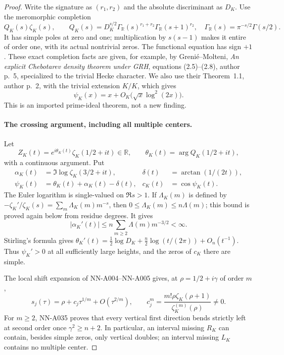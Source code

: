 \begin{proof}
Write the signature as $(r_1,r_2)$ and the absolute
discriminant as $D_K$. Use the meromorphic completion
\[
 Q_K(s)\zeta_K(s),\qquad
 Q_K(s)=D_K^{s/2}\Gamma_{\mathbb R}(s)^{r_1+r_2}
                         \Gamma_{\mathbb R}(s+1)^{r_2},
 \quad \Gamma_{\mathbb R}(s)=\pi^{-s/2}\Gamma(s/2).
\]
It has simple poles at zero and one; multiplication by
$s(s-1)$ makes it entire of order one, with its actual
nontrivial zeros. The functional equation has sign $+1$.
These exact completion facts are given, for example, by
Greni\'e--Molteni, \emph{An explicit Chebotarev density theorem
under GRH}, equations (2.5)--(2.8), author p.~5, specialized to
the trivial Hecke character. We also use their Theorem~1.1,
author p.~2, with the trivial extension $K/K$, which gives
\begin{equation}\label{eq:A043-PNT}
 \psi_K(x)=x+O_K\bigl(\sqrt{x}\log^2(2x)\bigr).
\end{equation}
This is an imported prime-ideal theorem, not a new finding.

\paragraph{The crossing argument, including all multiple centers.}
Let
\[
 Z_K(t)=e^{i\theta_K(t)}\zeta_K(1/2+it)\in\mathbb R,
 \qquad \theta_K(t)=\arg Q_K(1/2+it),
\]
with a continuous argument. Put
\begin{align*}
 \alpha_K(t)&=\Im\log\zeta_K(3/2+it),
   &\delta(t)&=\arctan(1/(2t)),\\
 \psi_K(t)&=\theta_K(t)+\alpha_K(t)-\delta(t),
   &c_K(t)&=\cos\psi_K(t).
\end{align*}
The Euler logarithm is single-valued on $\Re s>1$.
If $\Lambda_K(m)$ is defined by
$-\zeta_K'/\zeta_K(s)=\sum_m\Lambda_K(m)m^{-s}$, then
$0\le\Lambda_K(m)\le n\Lambda(m)$; this bound is proved
again below from residue degrees. It gives
\[
 |\alpha_K'(t)|\le n\sum_{m\ge2}\Lambda(m)m^{-3/2}<\infty.
\]
Stirling's formula gives
$\theta_K'(t)=\frac12\log D_K+\frac n2\log(t/(2\pi))+O_n(t^{-1})$.
Thus $\psi_K'>0$ at all sufficiently large heights, and
the zeros of $c_K$ there are simple.

The local shift expansion of NN-A004--NN-A005 gives, at
$\rho=1/2+i\gamma$ of order $m$,
\[
 s_j(\tau)=\rho+c_j\tau^{1/m}+O(\tau^{2/m}),\qquad
 c_j^m=\frac{m!\rho\zeta_K(\rho+1)}{\zeta_K^{(m)}(\rho)}\ne0.
\]
For $m\ge2$, NN-A035 proves that every vertical first
direction bends strictly left at second order once
$\gamma^2\ge n+2$. In particular, an interval missing
$R_K$ can contain, besides simple zeros, only vertical doubles;
an interval missing $L_K$ contains no multiple center.


\end{proof}

